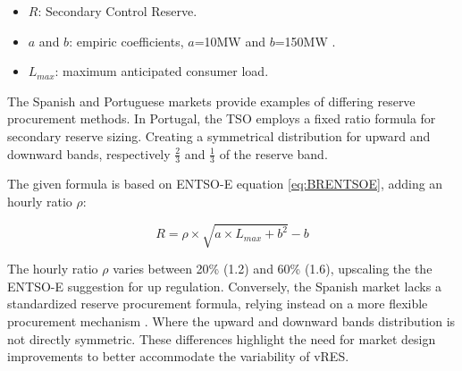 \begin{itemize}
  \item $R$: Secondary Control Reserve.
  \item $a$ and $b$: empiric coefficients, $a$=10MW and $b$=150MW .
  \item $L_{max}$: maximum anticipated consumer load.
\end{itemize}

The Spanish and Portuguese markets provide examples of differing reserve procurement methods. In Portugal, the \gls{TSO} employs a fixed ratio formula for secondary reserve sizing. Creating a symmetrical distribution for upward and downward bands, respectively $\frac{2}{3}$ and $\frac{1}{3}$ of the reserve band.\par
The given formula is based on \gls{ENTSO-E} equation \eqref{eq:BRENTSOE}, adding an hourly ratio $\rho$:

\begin{linenomath}
  \begin{equation}\label{eq:BRREN} 
    R = \rho \times \sqrt{a \times  L_{max} + b^{2}} - b 
  \end{equation}
  \end{linenomath}

The hourly ratio $\rho$ varies between 20\% (1.2) and 60\% (1.6), upscaling the the ENTSO-E suggestion for up regulation.
%
Conversely, the Spanish market lacks a standardized reserve procurement formula, relying instead on a more flexible procurement mechanism \cite{Frade2019_market}. Where the upward and downward bands distribution is not directly symmetric.
These differences highlight the need for market design improvements to better accommodate the variability of \gls{vRES}.



